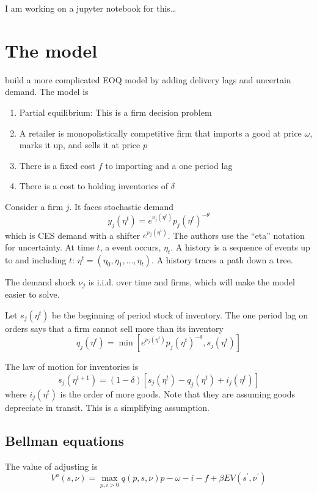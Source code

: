 \documentclass[11pt, pdftex]{article}
\begin{document}
I am working on a jupyter notebook for this\ldots

\section{The model}
\citet{alessandriaInvetories} build a more complicated EOQ model by adding delivery lags and uncertain demand. The model is
\begin{enumerate}
  \item Partial equilibrium: This is a firm decision problem
  \item A retailer is monopolistically competitive firm that imports a good at price $\omega$, marks it up, and sells it at price $p$
  \item There is a fixed cost $f$ to importing and a one period lag
  \item There is a cost to holding inventories of $\delta$
\end{enumerate}

Consider a firm $j$. It faces stochastic demand
\begin{equation}\label{eq:demand}
  y_j(\eta^t) = e^{\nu_j(\eta^t)}p_j(\eta^t)^{-\theta}
\end{equation}
which is CES demand with a shifter $e^{\nu_j(\eta^t)}$. The authors use the ``eta'' notation for uncertainty. At time $t$, a event occurs, $\eta_t$. A history is a sequence of events up to and including $t$: $\eta^t=\left(\eta_0, \eta_1,\ldots,\eta_t \right)$. A history traces a path down a tree.

The demand shock $\nu_j$ is i.i.d. over time and firms, which will make the model easier to solve.

Let $s_j(\eta^t)$ be the beginning of period stock of inventory. The one period lag on orders says that a firm cannot sell more than its inventory
\begin{equation}\label{eq:stock-out}
q_j(\eta^t) = \min [e^{\nu_j(\eta^t)}p_j(\eta^t)^{-\theta}, s_j(\eta^t)]
\end{equation}

The law of motion for inventories is
\begin{equation}\label{eq:lom}
  s_j(\eta^{t+1}) = (1-\delta)[ s_j(\eta^t)-q_j(\eta^t)+i_j(\eta^t) ]
\end{equation}
where $i_j(\eta^t)$ is the order of more goods. Note that they are assuming goods depreciate in transit. This is a simplifying assumption.

\subsection{Bellman equations}
The value of adjusting is
\begin{equation}\label{}
  V^a(s,\nu) = \max_{p,i>0} q(p,s,\nu)p-\omega-i-f+\beta EV(s^\prime,\nu^\prime)
\end{equation}
\end{document}

